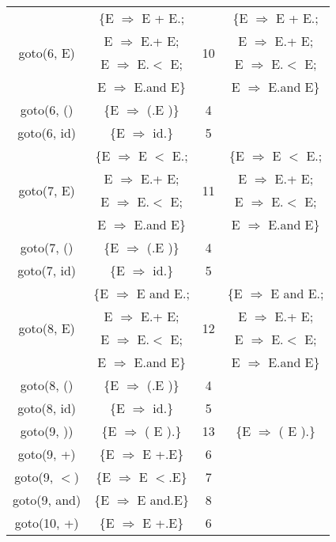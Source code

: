 \begin{table}[!ht]
\begin{minipage}[t]{.4\linewidth}
\begin{tabular}{|c|c|c|c|}
      \hline
      \multirow{4}{*}{goto(6, E)} & \{E $\Rightarrow$ E + E.; & \multirow{4}{*}{10}	& \{E $\Rightarrow$ E + E.; \\
      & E $\Rightarrow$ E.+ E; & & E $\Rightarrow$ E.+ E; \\
      & E $\Rightarrow$ E.$<$ E; & & E $\Rightarrow$ E.$<$ E; \\
      & E $\Rightarrow$ E.and E\} & & E $\Rightarrow$ E.and E\} \\
      \hline
      goto(6, () & \{E $\Rightarrow$ (.E )\}	& 4 & \\
      \hline
      goto(6, id)	& \{E $\Rightarrow$ id.\} & 5 & \\
      \hline
      \multirow{4}{*}{goto(7, E)} & \{E $\Rightarrow$ E $<$ E.; & \multirow{4}{*}{11} & \{E $\Rightarrow$ E $<$ E.; \\
      & E $\Rightarrow$ E.+ E; & & E $\Rightarrow$ E.+ E; \\
      & E $\Rightarrow$ E.$<$ E; & & E $\Rightarrow$ E.$<$ E; \\
      & E $\Rightarrow$ E.and E\}	& & E $\Rightarrow$ E.and E\} \\
      \hline
      goto(7, () & \{E $\Rightarrow$ (.E )\}	& 4 & \\
      \hline
      goto(7, id)	& \{E $\Rightarrow$ id.\} & 5 & \\
      \hline
      \multirow{4}{*}{goto(8, E)} & \{E $\Rightarrow$ E and E.; & \multirow{4}{*}{12} & \{E $\Rightarrow$ E and E.; \\
      & E $\Rightarrow$ E.+ E; & & E $\Rightarrow$ E.+ E; \\
      & E $\Rightarrow$ E.$<$ E; & & E $\Rightarrow$ E.$<$ E; \\
      & E $\Rightarrow$ E.and E\}	& & E $\Rightarrow$ E.and E\} \\
      \hline
      goto(8, () & \{E $\Rightarrow$ (.E )\}	& 4 & \\
      \hline
      goto(8, id)	& \{E $\Rightarrow$ id.\} & 5 & \\
      \hline
      goto(9, )) & \{E $\Rightarrow$ ( E ).\} & 13	& \{E $\Rightarrow$ ( E ).\} \\
      \hline
      goto(9, +) & \{E $\Rightarrow$ E +.E\}	& 6 & \\
      \hline
      goto(9, $<$) & \{E $\Rightarrow$ E $<$.E\}	& 7 & \\
      \hline
      goto(9, and) & \{E $\Rightarrow$ E and.E\}	& 8 & \\
      \hline
      goto(10, +)	& \{E $\Rightarrow$ E +.E\} & 6 & \\

\end{tabular}
\end{minipage}
\end{table}
